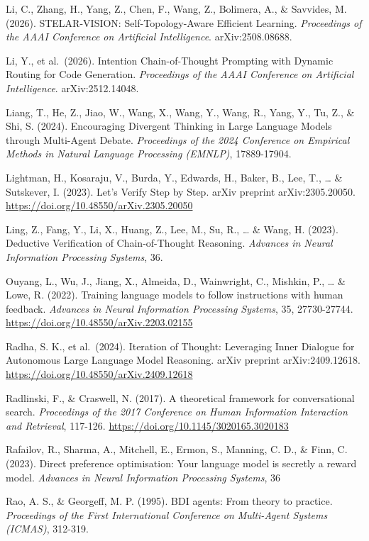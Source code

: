 \documentclass[11pt,a4paper]{article}
\begin{document}
Li, C., Zhang, H., Yang, Z., Chen, F., Wang, Z., Bolimera, A., \&
Savvides, M. (2026). STELAR-VISION: Self-Topology-Aware Efficient
Learning. \emph{Proceedings of the AAAI Conference on Artificial
Intelligence}. arXiv:2508.08688.

Li, Y., et al.~(2026). Intention Chain-of-Thought Prompting with Dynamic
Routing for Code Generation. \emph{Proceedings of the AAAI Conference on
Artificial Intelligence}. arXiv:2512.14048.

Liang, T., He, Z., Jiao, W., Wang, X., Wang, Y., Wang, R., Yang, Y., Tu,
Z., \& Shi, S. (2024). Encouraging Divergent Thinking in Large Language
Models through Multi-Agent Debate. \emph{Proceedings of the 2024
Conference on Empirical Methods in Natural Language Processing (EMNLP)},
17889-17904.

Lightman, H., Kosaraju, V., Burda, Y., Edwards, H., Baker, B., Lee, T.,
\ldots{} \& Sutskever, I. (2023). Let's Verify Step by Step. arXiv
preprint arXiv:2305.20050.
\url{https://doi.org/10.48550/arXiv.2305.20050}

Ling, Z., Fang, Y., Li, X., Huang, Z., Lee, M., Su, R., \ldots{} \&
Wang, H. (2023). Deductive Verification of Chain-of-Thought Reasoning.
\emph{Advances in Neural Information Processing Systems}, 36.

Ouyang, L., Wu, J., Jiang, X., Almeida, D., Wainwright, C., Mishkin, P.,
\ldots{} \& Lowe, R. (2022). Training language models to follow
instructions with human feedback. \emph{Advances in Neural Information
Processing Systems}, 35, 27730-27744.
\url{https://doi.org/10.48550/arXiv.2203.02155}

Radha, S. K., et al.~(2024). Iteration of Thought: Leveraging Inner
Dialogue for Autonomous Large Language Model Reasoning. arXiv preprint
arXiv:2409.12618. \url{https://doi.org/10.48550/arXiv.2409.12618}

Radlinski, F., \& Craswell, N. (2017). A theoretical framework for
conversational search. \emph{Proceedings of the 2017 Conference on Human
Information Interaction and Retrieval}, 117-126.
\url{https://doi.org/10.1145/3020165.3020183}

Rafailov, R., Sharma, A., Mitchell, E., Ermon, S., Manning, C. D., \&
Finn, C. (2023). Direct preference optimisation: Your language model is
secretly a reward model. \emph{Advances in Neural Information Processing
Systems}, 36

Rao, A. S., \& Georgeff, M. P. (1995). BDI agents: From theory to
practice. \emph{Proceedings of the First International Conference on
Multi-Agent Systems (ICMAS)}, 312-319.
\end{document}
